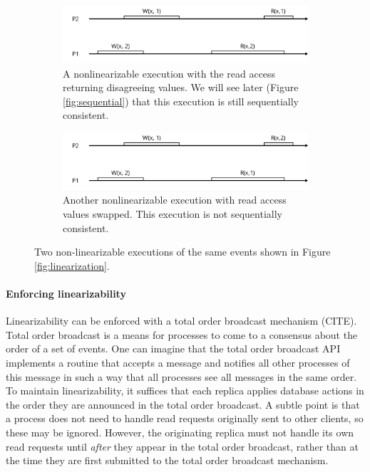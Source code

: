 \documentclass[]             %
{NASA}                       %
\theoremstyle{definition}
\begin{document}
\begin{figure}
     \begin{subfigure}[a]{1\textwidth}
         \center
         \includegraphics[scale=0.4]{images/nonlinear1.png}
         \caption{A nonlinearizable execution with the read access returning disagreeing values. We will see later (Figure \ref{fig:sequential}) that this execution is still sequentially consistent. }
         \label{fig:nonlinear1}
     \end{subfigure}
     \begin{subfigure}[b]{1\textwidth}
         \center
         \includegraphics[scale=0.4]{images/nonlinear2.png}
         \caption{Another nonlinearizable execution with read access values swapped. This execution is not sequentially consistent.}
         \label{fig:nonlinear2}
     \end{subfigure}
  \caption{Two non-linearizable executions of the same events shown in Figure \ref{fig:linearization}.}
  \label{fig:nonlinearizable}
\end{figure}

\hypertarget{enforcing-linearizability}{%
\paragraph{Enforcing linearizability}\label{enforcing-linearizability}}

Linearizability can be enforced with a total order broadcast mechanism
(CITE). Total order broadcast is a means for processes to come to a
consensus about the order of a set of events. One can imagine that the
total order broadcast API implements a routine that accepts a message
and notifies all other processes of this message in such a way that all
processes see all messages in the same order. To maintain
linearizability, it suffices that each replica applies database actions
in the order they are announced in the total order broadcast. A subtle
point is that a process does not need to handle read requests originally
sent to other clients, so these may be ignored. However, the originating
replica must not handle its own read requests until \emph{after} they
appear in the total order broadcast, rather than at the time they are
first submitted to the total order broadcast mechanism.
\end{document}
